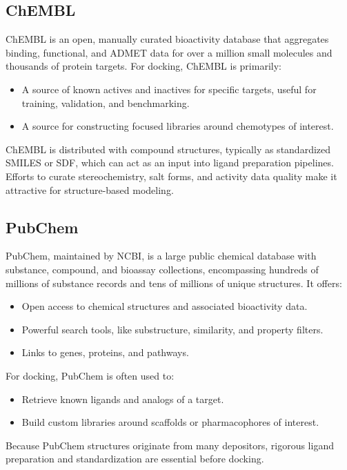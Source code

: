 \documentclass[12pt, a4paper]{article}
\begin{document}
\subsection{ChEMBL}

ChEMBL is an open, manually curated bioactivity database that aggregates binding, functional, and ADMET data for over a million small molecules and thousands of protein targets.\cite{CH6_Gaulton2012} For docking, ChEMBL is primarily:
\begin{itemize}
  \item A source of known actives and inactives for specific targets, useful for training, validation, and benchmarking.
  \item A source for constructing focused libraries around chemotypes of interest.
\end{itemize}

ChEMBL is distributed with compound structures, typically as standardized SMILES or SDF, which can act as an input into ligand preparation pipelines. Efforts to curate stereochemistry, salt forms, and activity data quality make it attractive for structure-based modeling.

\subsection{PubChem}

PubChem, maintained by NCBI, is a large public chemical database with substance, compound, and bioassay collections, encompassing hundreds of millions of substance records and tens of millions of unique structures.\cite{CH6_KimPubChem} It offers:
\begin{itemize}
  \item Open access to chemical structures and associated bioactivity data.
  \item Powerful search tools, like substructure, similarity, and property filters.
  \item Links to genes, proteins, and pathways.
\end{itemize}

For docking, PubChem is often used to:
\begin{itemize}
  \item Retrieve known ligands and analogs of a target.
  \item Build custom libraries around scaffolds or pharmacophores of interest.
\end{itemize}

Because PubChem structures originate from many depositors, rigorous ligand preparation and standardization are essential before docking.
\end{document}
